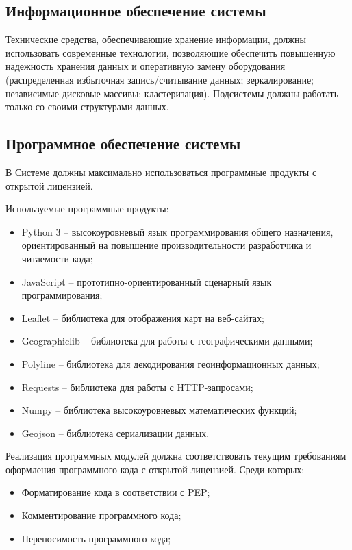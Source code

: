 \subsection{Информационное обеспечение системы}
Технические средства, обеспечивающие хранение информации, должны использовать современные 
технологии, позволяющие обеспечить повышенную надежность хранения данных и оперативную замену 
оборудования (распределенная избыточная запись/считывание данных; зеркалирование; независимые 
дисковые массивы; кластеризация). Подсистемы должны работать только со своими структурами данных.

\subsection{Программное обеспечение системы}
В Системе должны максимально использоваться программные продукты с открытой лицензией. 

Используемые программные продукты:
\begin{itemize}
    \item Python 3 -- высокоуровневый язык программирования общего назначения, ориентированный на повышение 
        производительности разработчика и читаемости кода;
    \item JavaScript -- прототипно-ориентированный сценарный язык программирования;
    \item Leaflet -- библиотека для отображения карт на веб-сайтах;
    \item Geographiclib -- библиотека для работы с географическими данными;
    \item Polyline -- библиотека для декодирования геоинформационных данных;
    \item Requests -- библиотека для работы с HTTP-запросами;
    \item Numpy -- библиотека высокоуровневых математических функций;
    \item Geojson -- библиотека сериализации данных.
\end{itemize}

Реализация программных модулей должна соответствовать текущим требованиям оформления программного кода 
с открытой лицензией. Среди которых:
\begin{itemize}
    \item Форматирование кода в соответствии с PEP;
    \item Комментирование программного кода;
    \item Переносимость программного кода;
\end{itemize}

